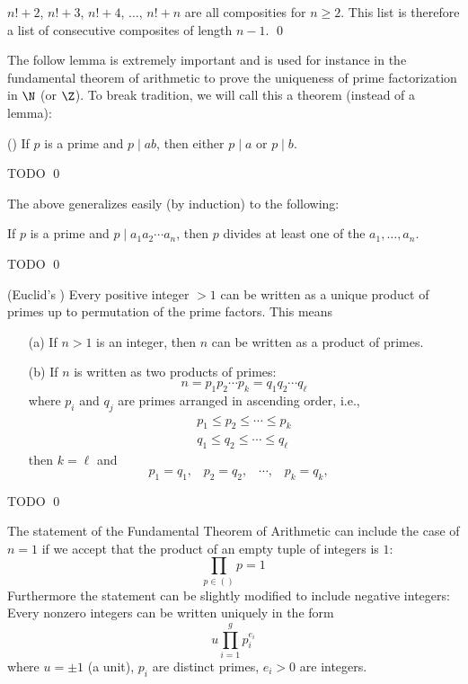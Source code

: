 \proof
\BEGINTODO
$n!+2$,
$n!+3$,
$n!+4$,
$\ldots$,
$n!+n$
are all composities for $n \geq 2$.
This list is therefore a list of consecutive composites of length
$n - 1$.
\ENDTODO
\qed

The follow lemma is extremely important and is used
for instance in the fundamental theorem of arithmetic to prove
the uniqueness of prime factorization in $\N$ (or $\Z$).
To break tradition, we will call this a theorem (instead of a lemma):

\begin{thm}
  \textnormal{()}
  If $p$ is a prime and $p \mid ab$, then either $p \mid a$ or $p \mid b$.
\end{thm}

\proof
TODO
\qed



The above generalizes easily (by induction) to the following:


\begin{cor}
If $p$ is a prime and $p \mid a_1 a_2 \cdots a_n$, then 
$p$ divides at least one of the $a_1, \ldots, a_n$.
\end{cor}
\proof
TODO
\qed


\begin{thm} \textnormal{(Euclid's )}
Every positive integer $> 1$ can be written as a unique product of primes
up to permutation of the prime factors.
This means
\begin{enumerate}[nosep,label=\textnormal{(\alph*)}]
\item[\textnormal{(a)}] If $n > 1$ is an integer, then $n$ can be written as a product
of primes.
\item[\textnormal{(b)}] If $n$ is written as two products of primes:
\[
n = p_1 p_2 \cdots p_k = q_1 q_2 \cdots q_\ell
\]
where $p_i$ and $q_j$ are primes arranged in ascending order, i.e.,
\begin{align*}
p_1 \leq p_2 \leq \cdots \leq p_k \\
q_1 \leq q_2 \leq \cdots \leq q_\ell
\end{align*}
then $k = \ell$ and 
\[
p_1 = q_1, \,\,\,\,\,
p_2 = q_2, \,\,\,\,\,
\cdots, \,\,\,\,\,
p_k = q_k, \,\,\,\,\,
\]
\end{enumerate}
\end{thm}

\proof
TODO
\qed


The statement of the Fundamental Theorem of Arithmetic can include
the case of $n = 1$ if we accept that the product of an empty
tuple of integers is $1$:
\[
\prod_{p \in ()} p = 1
\]
Furthermore the statement can be slightly modified to include
negative integers:
Every nonzero integers can be written uniquely in the form
\[
u \prod_{i=1}^g p_i^{e_i}
\]
where $u = \pm 1$ (a unit), $p_i$ are distinct primes, $e_i > 0$ are integers.

